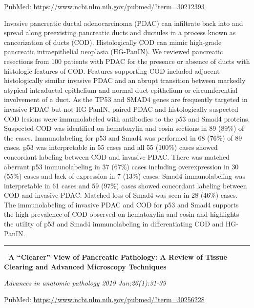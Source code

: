 \documentclass[]{article}
\begin{document}
PubMed: \url{https://www.ncbi.nlm.nih.gov/pubmed/?term=30212393}

Invasive pancreatic ductal adenocarcinoma (PDAC) can infiltrate back
into and spread along preexisting pancreatic ducts and ductules in a
process known as cancerization of ducts (COD). Histologically COD can
mimic high-grade pancreatic intraepithelial neoplasia (HG-PanIN). We
reviewed pancreatic resections from 100 patients with PDAC for the
presence or absence of ducts with histologic features of COD. Features
supporting COD included adjacent histologically similar invasive PDAC
and an abrupt transition between markedly atypical intraductal
epithelium and normal duct epithelium or circumferential involvement of
a duct. As the TP53 and SMAD4 genes are frequently targeted in invasive
PDAC but not HG-PanIN, paired PDAC and histologically suspected COD
lesions were immunolabeled with antibodies to the p53 and Smad4
proteins. Suspected COD was identified on hematoxylin and eosin sections
in 89 (89\%) of the cases. Immunolabeling for p53 and Smad4 was
performed in 68 (76\%) of 89 cases. p53 was interpretable in 55 cases
and all 55 (100\%) cases showed concordant labeling between COD and
invasive PDAC. There was matched aberrant p53 immunolabeling in 37
(67\%) cases including overexpression in 30 (55\%) cases and lack of
expression in 7 (13\%) cases. Smad4 immunolabeling was interpretable in
61 cases and 59 (97\%) cases showed concordant labeling between COD and
invasive PDAC. Matched loss of Smad4 was seen in 28 (46\%) cases. The
immunolabeling of invasive PDAC and COD for p53 and Smad4 supports the
high prevalence of COD observed on hematoxylin and eosin and highlights
the utility of p53 and Smad4 immunolabeling in differentiating COD and
HG-PanIN.

{}

{}

\begin{center}\rule{0.5\linewidth}{\linethickness}\end{center}

 - \textbf{A ``Clearer'' View of Pancreatic Pathology: A Review of
Tissue Clearing and Advanced Microscopy Techniques}

\emph{Advances in anatomic pathology 2019 Jan;26(1):31-39}

PubMed: \url{https://www.ncbi.nlm.nih.gov/pubmed/?term=30256228}
\end{document}
